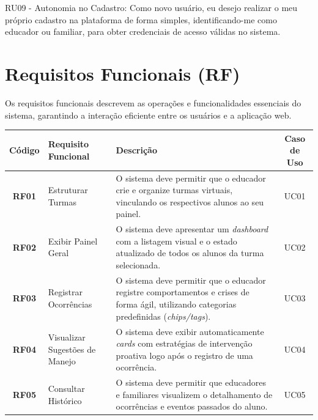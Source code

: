 RU09 - Autonomia no Cadastro: Como novo usuário, eu desejo realizar o meu próprio cadastro na plataforma de forma simples, identificando-me como educador ou familiar, para obter credenciais de acesso válidas no sistema.

\vspace{0.5cm}
\section{Requisitos Funcionais (RF)}

Os requisitos funcionais descrevem as operações e funcionalidades essenciais do sistema, garantindo a interação eficiente entre os usuários e a aplicação web.

\begin{quadro}[H]
    \centering
    \caption{Quadro de Requisitos Funcionais do Sistema}
    \label{quadro:requisitos_funcionais}
    \renewcommand{\arraystretch}{1.5} %
    \small %
    
    \begin{tabular}{|c|p{4cm}|p{7.5cm}|c|}
        \hline
        \textbf{Código} & \textbf{Requisito Funcional} & \textbf{Descrição} & \textbf{Caso de Uso} \\ \hline
        
        \textbf{RF01} & Estruturar Turmas & O sistema deve permitir que o educador crie e organize turmas virtuais, vinculando os respectivos alunos ao seu painel. & UC01 \\ \hline
        
        \textbf{RF02} & Exibir Painel Geral & O sistema deve apresentar um \textit{dashboard} com a listagem visual e o estado atualizado de todos os alunos da turma selecionada. & UC02 \\ \hline
        
        \textbf{RF03} & Registrar Ocorrências & O sistema deve permitir que o educador registre comportamentos e crises de forma ágil, utilizando categorias predefinidas (\textit{chips/tags}). & UC03 \\ \hline
        
        \textbf{RF04} & Visualizar Sugestões de Manejo & O sistema deve exibir automaticamente \textit{cards} com estratégias de intervenção proativa logo após o registro de uma ocorrência. & UC04 \\ \hline
        
        \textbf{RF05} & Consultar Histórico & O sistema deve permitir que educadores e familiares visualizem o detalhamento de ocorrências e eventos passados do aluno. & UC05 \\ \hline
        

\end{tabular}
\end{quadro}
